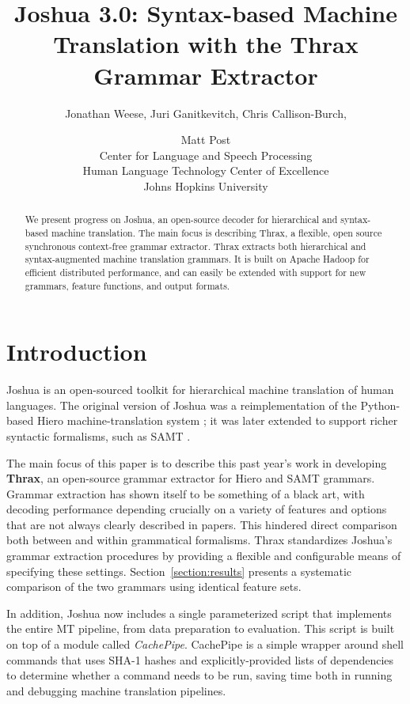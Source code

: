 \documentclass[11pt]{article}
\title{Joshua 3.0: Syntax-based Machine Translation with the Thrax
  Grammar Extractor}
\author{Jonathan Weese\aff, Juri Ganitkevitch\aff, Chris Callison-Burch\aff, \and Matt Post\afff \\
\aff Center for Language and Speech Processing \\
\afff Human Language Technology Center of Excellence \\
Johns Hopkins University}
\date{}
\begin{document}
\maketitle

\begin{abstract}
We present progress on Joshua, an open-source decoder for hierarchical
and syntax-based machine translation.  The main focus is describing
Thrax, a flexible, open source synchronous context-free grammar
extractor.  Thrax extracts both hierarchical \cite{Chiang2007} and
syntax-augmented machine translation \cite{samt2006} grammars.  It is
built on Apache Hadoop for efficient distributed performance, and can
easily be extended with support for new grammars, feature functions,
and output formats.
\end{abstract}

\section{Introduction}

Joshua is an open-sourced toolkit for hierarchical machine translation
of human languages.  The original version of Joshua \cite{Joshua-WMT}
was a reimplementation of the Python-based Hiero machine-translation
system \cite{Chiang2007}; it was later extended \cite{li2010joshua} to
support richer syntactic formalisms, such as SAMT \cite{samt2006}.

The main focus of this paper is to describe this past year's work in
developing {\bf Thrax}, an open-source grammar extractor for Hiero and
SAMT grammars.  Grammar extraction has shown itself to be something of
a black art, with decoding performance depending crucially on a
variety of features and options that are not always clearly described in papers.
This hindered direct comparison both between and within grammatical formalisms.
Thrax standardizes Joshua's grammar extraction procedures by providing
a flexible and configurable means of specifying these settings.
Section~\ref{section:results} presents a systematic comparison of the
two grammars using identical feature sets.

In addition, Joshua now includes a single parameterized script that
implements the entire MT pipeline, from data preparation to
evaluation.  This script is built on top of a module called
\emph{CachePipe}.  CachePipe is a simple wrapper around shell commands
that uses SHA-1 hashes and explicitly-provided lists of dependencies
to determine whether a command needs to be run, saving time both in
running and debugging machine translation pipelines.
\end{document}
